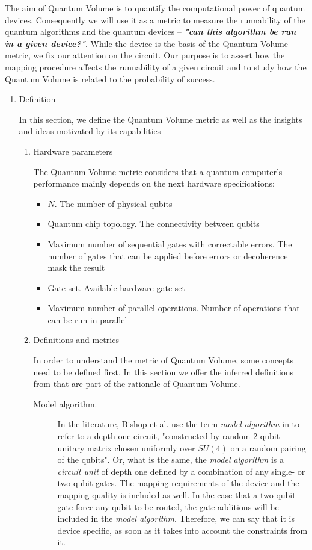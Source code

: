 The aim of Quantum Volume is to quantify the computational power of quantum devices. 
Consequently we will use it as a metric to measure the runnability of the quantum algorithms and the quantum devices -- \emph{\textbf{"can this algorithm be run in a given device?"}}.
While the device is the basis of the Quantum Volume metric, we fix our attention on the circuit.
Our purpose is to assert how the mapping procedure affects the runnability of a given circuit and to study how the Quantum Volume is related to the probability of success.

\begin{enumerate}
\item Definition
\label{sec:orgb02c64a}

In this section, we define the Quantum Volume metric as well as the insights and ideas motivated by its capabilities

\begin{enumerate}
\item Hardware parameters
\label{sec:org5c5b9d3}

The Quantum Volume metric considers that a quantum computer's performance mainly depends on the next hardware specifications:

\begin{itemize}
\item \(N\). The number of physical qubits
\item Quantum chip topology. The connectivity between qubits
\item Maximum number of sequential gates with correctable errors. The number of gates that can be applied before errors or decoherence mask the result
\item Gate set. Available hardware gate set
\item Maximum number of parallel operations. Number of operations that can be run in parallel
\end{itemize}

\item Definitions and metrics
\label{sec:org30bb1f6}

In order to understand the metric of Quantum Volume, some concepts need to be defined first. 
In this section we offer the inferred definitions from \cite{Bishop_2017,Moll_2018} that are part of the rationale of Quantum Volume.


\begin{description}
\item[{Model algorithm.}] In the literature, Bishop et al. use the term \emph{model algorithm} in \cite{Bishop_2017} to refer to a depth-one circuit, "constructed by random 2-qubit unitary matrix chosen uniformly over \(SU (4)\) on a random pairing of the qubits". Or, what is the same, the \emph{model algorithm} is a \emph{circuit unit} of depth one defined by a combination of any single- or two-qubit gates. The mapping requirements of the device and the mapping quality is included as well. In the case that a two-qubit gate force any qubit to be routed, the gate additions will be included in the \emph{model algorithm}. Therefore, we can say that it is device specific, as soon as it takes into account the constraints from it.
\end{description}


\end{enumerate}
\end{enumerate}
